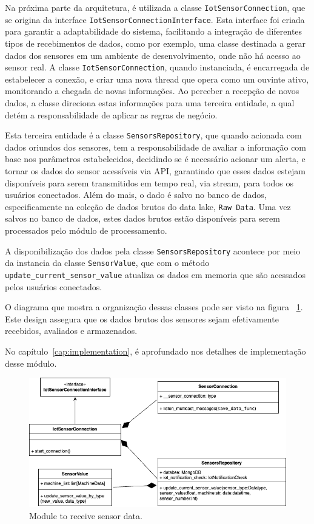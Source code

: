 Na próxima parte da arquitetura, é utilizada a classe \texttt{IotSensorConnection}, que se origina da interface \texttt{IotSensorConnectionInterface}. Esta interface foi criada para garantir a adaptabilidade do sistema, facilitando a integração de diferentes tipos de recebimentos de dados, como por exemplo, uma classe destinada a gerar dados dos sensores em um ambiente de desenvolvimento, onde não há acesso ao sensor real. A classe \texttt{IotSensorConnection}, quando instanciada, é encarregada de estabelecer a conexão, e criar uma nova thread que opera como um ouvinte ativo, monitorando a chegada de novas informações. Ao perceber a recepção de novos dados, a classe direciona estas informações para uma terceira entidade, a qual detém a responsabilidade de aplicar as regras de negócio.

Esta terceira entidade é a classe \texttt{SensorsRepository}, que quando acionada com dados oriundos dos sensores, tem a responsabilidade de avaliar a informação com base nos parâmetros estabelecidos, decidindo se é necessário acionar um alerta, e tornar os dados do sensor acessíveis via API, garantindo que esses dados estejam disponíveis para serem transmitidos em tempo real, via stream, para todos os usuários conectados. Além do mais, o dado é salvo no banco de dados, especificamente na coleção de dados brutos do data lake, \texttt{Raw Data}. Uma vez salvos no banco de dados, estes dados brutos estão disponíveis para serem processados pelo módulo de processamento.

A disponibilização dos dados pela classe \texttt{SensorsRepository} acontece por meio da instancia da classe \texttt{SensorValue}, que com o método \texttt{update\_current\_sensor\_value} atualiza os dados em memoria que são acessados pelos usuários conectados.

O diagrama que mostra a organização dessas classes pode ser visto na figura ~\ref{fig:receiveData}. Este design assegura que os dados brutos dos sensores sejam efetivamente recebidos, avaliados e armazenados.

No capítulo~\ref{cap:implementation}, é aprofundado nos detalhes de implementação desse módulo.


\begin{figure}[htbp]
	\centering
	\includegraphics[width=\textwidth]{images/recebimento_dados.png}
	\caption{Module to receive sensor data.}
	\label{fig:receiveData}
\end{figure}


